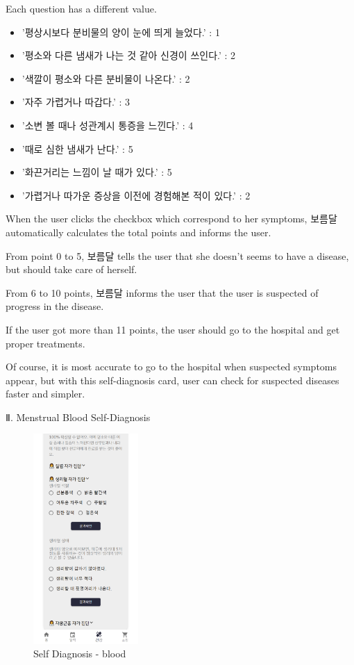 \documentclass[conference]{IEEEtran}
\begin{document}
\begin{itemize}
\begin{enumerate}
        Each question has a different value. 
        \begin{itemize}
            \item '평상시보다 분비물의 양이 눈에 띄게 늘었다.' : 1
            \item '평소와 다른 냄새가 나는 것 같아 신경이 쓰인다.' : 2 
            \item '색깔이 평소와 다른 분비물이 나온다.' : 2
            \item '자주 가렵거나 따갑다.' : 3 
            \item '소변 볼 때나 성관계시 통증을 느낀다.' : 4 
            \item '때로 심한 냄새가 난다.' : 5 
            \item '화끈거리는 느낌이 날 때가 있다.' : 5 
            \item '가렵거나 따가운 증상을 이전에 경험해본 적이 있다.' : 2 
        \end{itemize}
        
        \setlength{\parindent}{2ex} When the user clicks the checkbox which correspond to her symptoms, 보름달 automatically calculates the total points and informs the user. 
        
        From point 0 to 5, 보름달 tells the user that she doesn't seems to have a disease, but should take care of herself.
        
        From 6 to 10 points, 보름달 informs the user that the user is suspected of progress in the disease.
        
        If the user got more than 11 points, the user should go to the hospital and get proper treatments. 

        Of course, it is most accurate to go to the hospital when suspected symptoms appear, but with this self-diagnosis card, user can check for suspected diseases faster and simpler.
        
        Ⅱ. Menstrual Blood Self-Diagnosis
        
        \begin{figure}[ht]
        \includegraphics[width=4cm, height=8cm, center]{bloodcolor.png}
        \caption{Self Diagnosis - blood}
        \label{fig37}
        \end{figure}
        

\end{enumerate}
\end{itemize}
\end{document}
